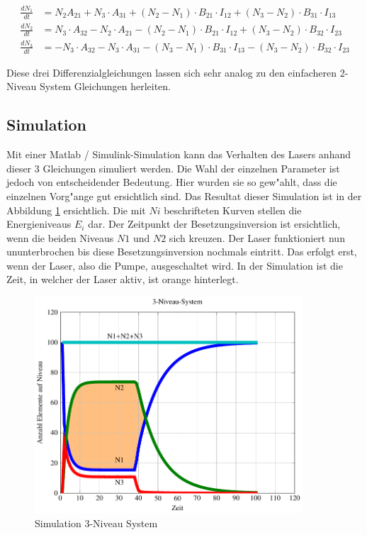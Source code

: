 \begin{refsection}
\begin{align*}
\frac{dN_1}{dt} &=
N_2  A_{21} 
+ N_3 \cdot  A_{31}
+ (N_2 - N_1) \cdot B_{21}\cdot  I_{12}
+ (N_3 - N_2) \cdot B_{31}\cdot  I_{13}\\
\frac{dN_2}{dt} &=
N_3 \cdot  A_{32} 
- N_2 \cdot  A_{21}
- (N_2 - N_1) \cdot  B_{21}\cdot  I_{12}
+ (N_3 - N_2) \cdot  B_{32}\cdot  I_{23}\\
\frac{dN_3}{dt} &=
- N_3 \cdot  A_{32}
- N_3 \cdot  A_{31}
- (N_3 - N_1) \cdot  B_{31}\cdot  I_{13}
- (N_3 - N_2) \cdot  B_{32}\cdot  I_{23}
\end{align*}


Diese drei Differenzialgleichungen lassen sich sehr analog zu den einfacheren
2-Niveau System Gleichungen herleiten.\cite{Lasergrundlagen}

\subsection{Simulation}
\label{3-Niveau Simulation}
Mit einer Matlab / Simulink-Simulation kann das Verhalten des Lasers anhand
dieser 3 Gleichungen simuliert werden.
Die Wahl der einzelnen Parameter ist jedoch von entscheidender Bedeutung.
Hier wurden sie so gew"ahlt, dass die einzelnen Vorg"ange gut ersichtlich sind.
Das Resultat dieser Simulation ist in der Abbildung
\ref{Simulation 3-Niveau System} ersichtlich.
Die mit $Ni$ beschrifteten Kurven stellen die Energieniveaus $E_i$ dar.
Der Zeitpunkt der Besetzungsinversion ist ersichtlich, wenn die beiden Niveaus
$N1$ und $N2$ sich kreuzen.
Der Laser funktioniert nun ununterbrochen bis diese Besetzungsinversion
nochmals eintritt.
Das erfolgt erst, wenn der Laser, also die Pumpe, ausgeschaltet wird.
In der Simulation ist die Zeit, in welcher der Laser aktiv, ist orange
hinterlegt.

\begin{flushleft}
\begin{figure}
\centering
\includegraphics[width = 10cm]{laser/bilder/3_niveau.pdf}
\caption{Simulation 3-Niveau System}
\label{Simulation 3-Niveau System}


\end{figure}
\end{flushleft}
\end{refsection}
